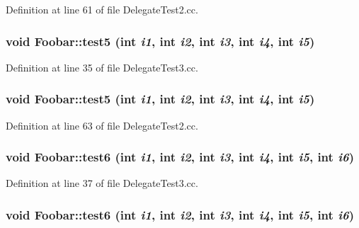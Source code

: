 Definition at line 61 of file Delegate\-Test2.cc.\hypertarget{structFoobar_a16}{
\subsubsection[test5]{\setlength{\rightskip}{0pt plus 5cm}void Foobar::test5 (int {\em i1}, int {\em i2}, int {\em i3}, int {\em i4}, int {\em i5})}}
\label{structFoobar_a16}




Definition at line 35 of file Delegate\-Test3.cc.\hypertarget{structFoobar_a5}{
\subsubsection[test5]{\setlength{\rightskip}{0pt plus 5cm}void Foobar::test5 (int {\em i1}, int {\em i2}, int {\em i3}, int {\em i4}, int {\em i5})}}
\label{structFoobar_a5}




Definition at line 63 of file Delegate\-Test2.cc.\hypertarget{structFoobar_a17}{
\subsubsection[test6]{\setlength{\rightskip}{0pt plus 5cm}void Foobar::test6 (int {\em i1}, int {\em i2}, int {\em i3}, int {\em i4}, int {\em i5}, int {\em i6})}}
\label{structFoobar_a17}




Definition at line 37 of file Delegate\-Test3.cc.\hypertarget{structFoobar_a6}{
\subsubsection[test6]{\setlength{\rightskip}{0pt plus 5cm}void Foobar::test6 (int {\em i1}, int {\em i2}, int {\em i3}, int {\em i4}, int {\em i5}, int {\em i6})}}
\label{structFoobar_a6}




